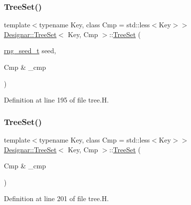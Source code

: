\subsubsection{\texorpdfstring{Tree\+Set()}{TreeSet()}\hspace{0.1cm}{\footnotesize\ttfamily [1/7]}}
{\footnotesize\ttfamily template$<$typename Key, class Cmp = std\+::less$<$\+Key$>$$>$ \\
\hyperlink{class_designar_1_1_tree_set}{Designar\+::\+Tree\+Set}$<$ Key, Cmp $>$\+::\hyperlink{class_designar_1_1_tree_set}{Tree\+Set} (\begin{DoxyParamCaption}\item[{\hyperlink{namespace_designar_ad621b5646d45288c5d6a1e1dfe7531a8}{rng\+\_\+seed\+\_\+t}}]{seed,  }\item[{Cmp \&}]{\+\_\+cmp }\end{DoxyParamCaption})\hspace{0.3cm}{\ttfamily [inline]}}



Definition at line 195 of file tree.\+H.

\mbox{\label{class_designar_1_1_tree_set_adeb0456caadfe5e105d2070bf8405d47}} 
\subsubsection{\texorpdfstring{Tree\+Set()}{TreeSet()}\hspace{0.1cm}{\footnotesize\ttfamily [2/7]}}
{\footnotesize\ttfamily template$<$typename Key, class Cmp = std\+::less$<$\+Key$>$$>$ \\
\hyperlink{class_designar_1_1_tree_set}{Designar\+::\+Tree\+Set}$<$ Key, Cmp $>$\+::\hyperlink{class_designar_1_1_tree_set}{Tree\+Set} (\begin{DoxyParamCaption}\item[{Cmp \&}]{\+\_\+cmp }\end{DoxyParamCaption})\hspace{0.3cm}{\ttfamily [inline]}}



Definition at line 201 of file tree.\+H.

\mbox{\label{class_designar_1_1_tree_set_a41e2a227975e1e8adfe261adf99502e7}} 

